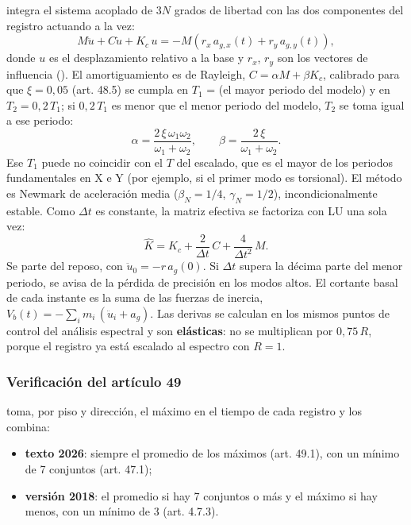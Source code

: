  integra el sistema acoplado de $3N$ grados de libertad con las dos
componentes del registro actuando a la vez:
\begin{equation}
	M\ddot{u} + C\dot{u} + K_c\,u = -M\left(r_x\,a_{g,x}(t) + r_y\,a_{g,y}(t)\right),
	\label{eq:sis-movimiento}
\end{equation}
donde $u$ es el desplazamiento relativo a la base y $r_x$, $r_y$ son los vectores de influencia
(). El amortiguamiento es de Rayleigh, $C = \alpha M + \beta K_c$, calibrado para que
$\xi = 0{,}05$ (art. 48.5) se cumpla en $T_1$ =  (el mayor periodo del modelo) y en $T_2 = 0{,}2\,T_1$;
si $0{,}2\,T_1$ es menor que el menor periodo del modelo, $T_2$ se toma igual a ese periodo:
\begin{equation}
	\alpha = \frac{2\,\xi\,\omega_1\omega_2}{\omega_1 + \omega_2}, \qquad \beta = \frac{2\,\xi}{\omega_1 + \omega_2} .
	\label{eq:sis-rayleigh}
\end{equation}
Ese $T_1$ puede no coincidir con el $T$ del escalado, que es el mayor de los periodos fundamentales en X e Y (por
ejemplo, si el primer modo es torsional). El método es Newmark de aceleración media ($\beta_N = 1/4$, $\gamma_N = 1/2$), incondicionalmente estable. Como
$\Delta t$ es constante, la matriz efectiva se factoriza con LU una sola vez:
\begin{equation}
	\hat{K} = K_c + \frac{2}{\Delta t}\,C + \frac{4}{\Delta t^2}\,M .
	\label{eq:sis-newmark}
\end{equation}
Se parte del reposo, con $\ddot{u}_0 = -r\,a_g(0)$. Si $\Delta t$ supera la décima parte del menor periodo, se avisa de
la pérdida de precisión en los modos altos. El cortante basal de cada instante es la suma de las fuerzas de inercia,
$V_b(t) = -\sum_i m_i\,(\ddot{u}_i + a_g)$. Las derivas se calculan en los mismos puntos de control del análisis
espectral y son \textbf{elásticas}: no se multiplican por $0{,}75\,R$, porque el registro ya está escalado al espectro con
$R = 1$.

\subsubsection{Verificación del artículo 49}

 toma, por piso y dirección, el máximo en el tiempo de cada registro
y los combina:

\begin{itemize}
	\item \textbf{texto 2026}: siempre el promedio de los máximos (art. 49.1), con un mínimo de 7 conjuntos (art. 47.1);
	\item \textbf{versión 2018}: el promedio si hay 7 conjuntos o más y el máximo si hay menos, con un mínimo de 3
	      (art. 4.7.3).
\end{itemize}

